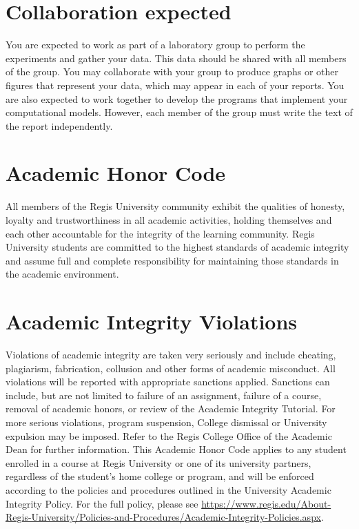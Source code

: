 \documentclass[11pt]{article}
\begin{document}
\section{Collaboration expected}
You are expected to work as part of a laboratory group to perform the 
experiments and gather your data.  This data should be shared with all
members of the group.  You may collaborate with your group to produce 
graphs or other figures that represent your data, which may appear in each of 
your reports.  You are also expected to work together to develop the programs
that implement your computational models.
However, each member of the group must write the text of the 
report independently. 

\section{Academic Honor Code}
All members of the Regis University community exhibit the qualities of honesty, loyalty and trustworthiness in all academic activities, holding themselves and each other accountable for the integrity of the learning community. Regis University students are committed to the highest standards of academic integrity and assume full and complete responsibility for maintaining those standards in the academic environment.

\section{Academic Integrity Violations}

Violations of academic integrity are taken very seriously and include cheating, plagiarism, fabrication, collusion and other forms of academic misconduct.  All violations will be reported with appropriate sanctions applied.  Sanctions can include, but are not limited to failure of an assignment, failure of a course, removal of academic honors, or review of the Academic Integrity Tutorial.  For more serious violations, program suspension, College dismissal or University expulsion may be imposed.  Refer to the Regis College Office of the Academic Dean for further information.  This Academic Honor Code applies to any student enrolled in a course at Regis University or one of its university partners, regardless of the student's home college or program, and will be enforced according to the policies and procedures outlined in the University Academic Integrity Policy.  For the full policy, please see \url{https://www.regis.edu/About-Regis-University/Policies-and-Procedures/Academic-Integrity-Policies.aspx}.
\end{document}
